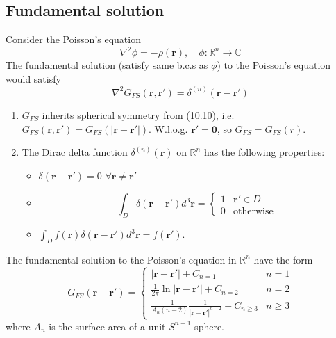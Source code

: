\documentclass[a4paper]{article}
\begin{document}
\subsection{Fundamental solution}
\begin{defi}
Consider the Poisson's equation
\begin{equation}
\nabla^2\phi=-\rho(\mathbf{r}),\quad \phi:\mathbb{R}^n\rightarrow\mathbb{C}\tag{10.10}
\end{equation}
The fundamental solution (satisfy same b.c.s as $\phi$) to the Poisson's equation would satisfy
\begin{equation}
\nabla^2G_{FS}(\mathbf{r},\mathbf{r'})=\delta^{(n)}(\mathbf{r}-\mathbf{r'})\tag{10.11}
\end{equation}
\end{defi}
\begin{remarks}\leavevmode
\begin{enumerate}
    \item $G_{FS}$ inherits spherical symmetry from (10.10), i.e. $G_{FS}(\mathbf{r},\mathbf{r'})=G_{FS}(|\mathbf{r}-\mathbf{r'}|)$. W.l.o.g. $\mathbf{r'}=\boldsymbol{0}$, so $G_{FS}=G_{FS}(r)$.
    \item The Dirac delta function $\delta^{(n)}(\mathbf{r})$ on $\mathbb{R}^n$ has the following properties: 
\begin{itemize}
    \item $\delta(\mathbf{r}-\mathbf{r'})=0$ $\forall\mathbf{r}\neq\mathbf{r'}$
    \item 
    \begin{equation}
        \int_D\delta(\mathbf{r}-\mathbf{r'})d^3\mathbf{r}=\left\{
        \begin{array}{ll}
      1 & \mathbf{r'}\in D\\
      0 & \text{otherwise}
        \end{array}\right.\tag{10.12}
    \end{equation}
    \item $\int_Df(\mathbf{r})\delta(\mathbf{r}-\mathbf{r'})d^3\mathbf{r}=f(\mathbf{r'})$.
\end{itemize}
\end{enumerate}
\end{remarks}
\begin{prop}
The fundamental solution to the Poisson's equation in $\mathbb{R}^n$ have the form
\begin{equation}
    G_{FS}(\mathbf{r}-\mathbf{r'})=\left\{
        \begin{array}{ll}
      |\mathbf{r}-\mathbf{r'}|+C_{n=1} & n=1\\
      \frac{1}{2\pi}\ln|\mathbf{r}-\mathbf{r'}|+C_{n=2} & n=2\\
      \frac{-1}{A_n(n-2)}\frac{1}{|\mathbf{r}-\mathbf{r'}|^{n-2}}+C_{n\geq3} & n\geq3
        \end{array}
    \right.\tag{10.13} 
\end{equation}
where $A_n$ is the surface area of a unit $S^{n-1}$ sphere.
\end{prop}
\end{document}
